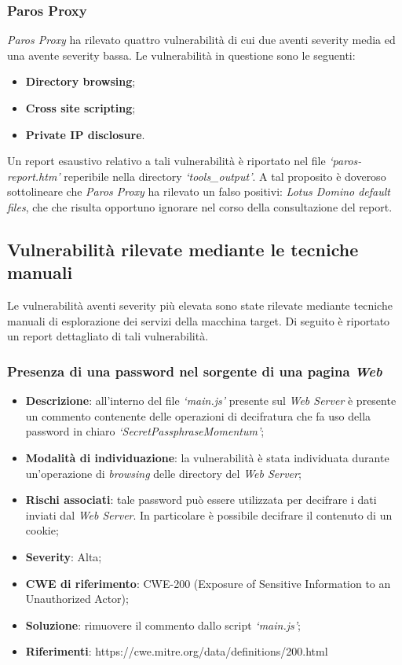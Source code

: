 \documentclass[a4paper,11pt,oneside,top=3cm,bottom=3cm,left=3.5cm,right=3.5cm,openright,reqno,table]{book}
\begin{document}
\subsubsection{Paros Proxy}
\emph{Paros Proxy} ha rilevato quattro vulnerabilità di cui due aventi severity media ed una avente severity bassa. Le vulnerabilità in questione sono le seguenti:
\begin{itemize}
    \item \textbf{Directory browsing};
    \item \textbf{Cross site scripting};
    \item \textbf{Private IP disclosure}.
\end{itemize}
Un report esaustivo relativo a tali vulnerabilità è riportato nel file \emph{`paros-report.htm'} reperibile nella directory \emph{`tools\_output'}. A tal proposito è doveroso sottolineare che \emph{Paros Proxy} ha rilevato un falso positivi: \emph{Lotus Domino default files}, che che risulta opportuno ignorare nel corso della consultazione del report.

\subsection{Vulnerabilità rilevate mediante le tecniche manuali}
Le vulnerabilità aventi severity più elevata sono state rilevate mediante tecniche manuali di esplorazione dei servizi della macchina target. Di seguito è riportato un report dettagliato di tali vulnerabilità.

\subsubsection{Presenza di una password nel sorgente di una pagina \emph{Web}}
\begin{itemize}
    \item \textbf{Descrizione}: all'interno del file \emph{`main.js'} presente sul \emph{Web Server} è presente un commento contenente delle operazioni di decifratura che fa uso della password in chiaro \emph{`SecretPassphraseMomentum'};
    \item \textbf{Modalità di individuazione}: la vulnerabilità è stata individuata durante un'operazione di \emph{browsing} delle directory del \emph{Web Server};
    \item \textbf{Rischi associati}: tale password può essere utilizzata per decifrare i dati inviati dal \emph{Web Server}. In particolare è possibile decifrare il contenuto di un cookie;
    \item \textbf{Severity}: Alta;
    \item \textbf{CWE di riferimento}: CWE-200 (Exposure of Sensitive Information to an Unauthorized Actor);
    \item \textbf{Soluzione}: rimuovere il commento dallo script \emph{`main.js'};
    \item \textbf{Riferimenti}: https://cwe.mitre.org/data/definitions/200.html
\end{itemize}
\end{document}
